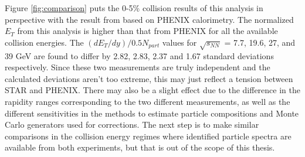 Figure \ref{fig:comparison} puts the 0-5\% collision results of this analysis in perspective with the result from \cite{PhysRevC.93.024901} based on PHENIX calorimetry. The normalized $E_{T}$ from this analysis is higher than that from PHENIX for all the available collision energies. The $(dE_{T}/dy)/0.5N_{part}$ values for $\sqrt{s_{NN}}$ = 7.7, 19.6, 27, and 39 GeV are found to differ by 2.82, 2.83, 2.37 and 1.67 standard deviations respectively. Since these two measurements are truly independent and the calculated deviations aren't too extreme, this may just reflect a tension between STAR and PHENIX. There may also be a slight effect due to the difference in the rapidity ranges corresponding to the two different measurements, as well as the different sensitivities in the methods to estimate particle compositions and Monte Carlo generators used for corrections. The next step is to make similar comparisons in the collision energy regimes where identified particle spectra are available from both experiments, but that is out of the scope of this thesis.%

	
	
